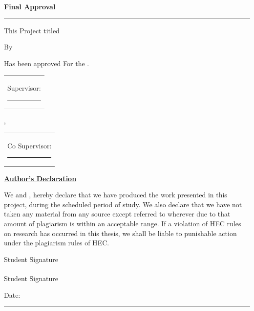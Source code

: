 \begin{center}
{\Large\bfseries Final Approval\par}
\vspace{0.3cm}\rule{\linewidth}{0.6pt}\par\vspace{0.6cm}
{This Project titled\par}
\vspace{0.4cm}
{\fontsize{22}{30}\selectfont \projecttitle\par}
\vspace{1.2cm}
By\par\vspace{1cm}
{\large\itshape \studentA\par \studentB\par}
\vspace{1.2cm}
Has been approved For the \university.\par
\vspace{0.8cm}
\begin{tabular}{@{}l@{}}
{\large Supervisor:}\rule{9cm}{0.4pt}
\end{tabular}\par\vspace{0.2cm}
\supervisor\par
\department, \universityshort\par
\vspace{1cm}
\begin{tabular}{@{}l@{}}
{\large Co Supervisor:}\rule{9cm}{0.4pt}
\end{tabular}\par\vspace{0.2cm}
\cosupervisor\par
\end{center}
\clearpage

\begin{center}{\Large\bfseries \underline{Author's Declaration}}\end{center}
\vspace{0.3cm}
We \studentA{} and \studentB, hereby declare that we have produced the work presented in this project, during the scheduled period of study. We also declare that we have not taken any material from any source except referred to wherever due to that amount of plagiarism is within an acceptable range. If a violation of HEC rules on research has occurred in this thesis, we shall be liable to punishable action under the plagiarism rules of HEC.
\vspace{4cm}
\begin{flushright}
Student Signature\\[0.6cm]
\studentA\\[0.6cm]
Student Signature\\[0.6cm]
\studentB
\end{flushright}
\vspace{0.6cm}
Date:\rule{3.5cm}{0.4pt}
\clearpage

